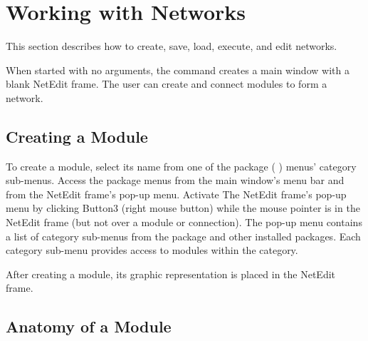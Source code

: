%
%
%
%
%

\chapter{Working with Networks}
\label{ch:workwithnets}

This section describes how to create, save, load, execute, and edit
networks.

When started with no arguments, the  command creates a
main window with a blank NetEdit frame. The user can create and
connect modules to form a network.


\section{Creating a Module}
\label{sec:creatingmodules}

To create a module, select its name from one of the package (\eg{}
\sr) menus' category sub-menus. Access the package menus from the main
window's menu bar and from the NetEdit frame's pop-up menu.  Activate
The NetEdit frame's pop-up menu by clicking Button3 (right mouse button)
while the mouse pointer is in the NetEdit frame (but not over a module
or connection).  The pop-up menu contains a list of category sub-menus
from the \sr{} package and other installed packages.  Each category
sub-menu provides access to modules within the category.

After creating a module, its graphic representation is 
placed in the NetEdit frame.

\section{Anatomy of a Module}
\label{sec:modanatomy}

  \newcommand{\modgraphic}%
  {\centerline{\epsfig{file=Figures/modgraphic-1.eps.gz,width=4in,
        bbllx=0, bblly=0, bburx=325, bbury=157}}}
\begin{htmlonly}
  \newcommand{\modgraphic}{%
  \htmladdimg[align=top,width="256",alt="SCIRun Module Graphic"]
  {../Figures/modgraphic-1.gif}}
\end{htmlonly}

